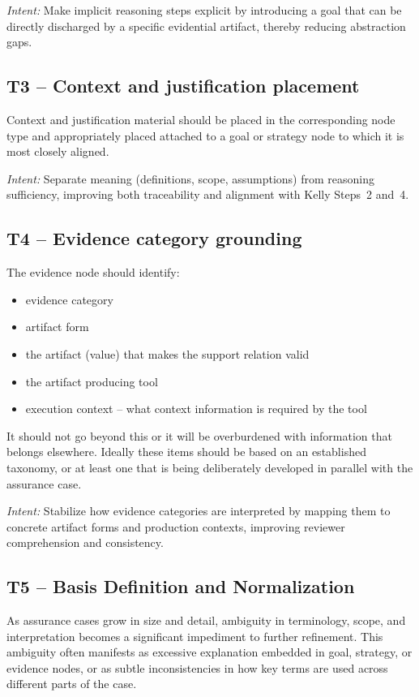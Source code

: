 \documentclass{article}
\begin{document}
\emph{Intent:} Make implicit reasoning steps explicit by introducing a goal that can be directly discharged by a specific evidential artifact, thereby reducing abstraction gaps.

\subsection{T3 -- Context and justification placement}
Context and justification material should be placed in the corresponding node type and appropriately placed attached to a goal or strategy node to which it is most closely aligned.

\emph{Intent:} Separate meaning (definitions, scope, assumptions) from reasoning sufficiency, improving both traceability and alignment with Kelly Steps~2 and~4.

\subsection{T4 -- Evidence category grounding}
The evidence node should identify:
\begin{itemize}
    \item evidence category
    \item artifact form
    \item the artifact (value) that makes the support relation valid
    \item the artifact producing tool
    \item execution context -- what context information is required by the tool
\end{itemize}
It should not go beyond this or it will be overburdened with information that belongs elsewhere.
Ideally these items should be based on an established taxonomy, or at least one that is being deliberately developed in parallel with the assurance case.

\emph{Intent:} Stabilize how evidence categories are interpreted by mapping them to concrete artifact forms and production contexts, improving reviewer comprehension and consistency.

\subsection{T5 -- Basis Definition and Normalization}
\label{sec:t5}

As assurance cases grow in size and detail, ambiguity in terminology, scope, and interpretation becomes a significant impediment to further refinement.
This ambiguity often manifests as excessive explanation embedded in goal, strategy, or evidence nodes, or as subtle inconsistencies in how key terms are used across different parts of the case.
\end{document}
